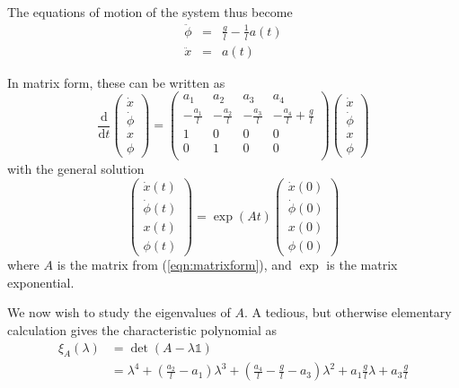 \documentclass[a4paper]{article}
\begin{document}
The equations of motion of the system thus become
\begin{eqnarray}
\ddot{\phi} &=& \frac{g}{l} - \frac{1}{l} a(t)\\
\ddot{x} &=& a(t)
\end{eqnarray}

In matrix form, these can be written as
\begin{equation}
\label{eqn:matrixform}
\frac{\mathrm{d}}{\mathrm{d}t}\left(\begin{array}{l}
\dot{x}\\ \dot{\phi}\\ x\\ \phi \end{array}\right)
= \left(\begin{array}{cccc}
a_1 & a_2 & a_3 & a_4\\
-\frac{a_1}{l} & -\frac{a_2}{l} & -\frac{a_3}{l} & -\frac{a_4}{l} + \frac{g}{l}\\
1 & 0 & 0 & 0\\
0 & 1 & 0 & 0\\
\end{array}\right)
\left(\begin{array}{l}
\dot{x}\\ \dot{\phi}\\ x\\ \phi \end{array}\right)
\end{equation}
with the general solution
\begin{equation}
\left(\begin{array}{l}\dot{x}(t)\\ \dot{\phi}(t)\\ x(t)\\ \phi(t) \end{array}\right)
= \exp(A t) \left(\begin{array}{l}\dot{x}(0)\\ \dot{\phi}(0)\\ x(0)\\ \phi(0) \end{array}\right)
\end{equation}
where $A$ is the matrix from (\ref{eqn:matrixform}), and $\exp$ is the matrix exponential.

We now wish to study the eigenvalues of $A$. A tedious, but otherwise elementary calculation gives the characteristic polynomial as
\begin{equation}
\begin{split}
\xi_A(\lambda) &= \det(A - \lambda \mathbb{1})\\
&= \lambda^4 + \left(\frac{a_2}{l} - a_1\right) \lambda^3 + \left(\frac{a_4}{l} - \frac{g}{l} - a_3\right) \lambda^2 + a_1 \frac{g}{l} \lambda + a_3 \frac{g}{l}
\end{split}
\end{equation}
\end{document}
